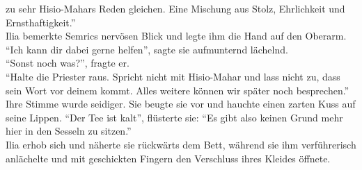 zu sehr Hisio-Mahars Reden gleichen. Eine Mischung aus Stolz, Ehrlichkeit und Ernsthaftigkeit.''\\
Ilia bemerkte Semrics nervösen Blick und legte ihm die Hand auf den Oberarm. ``Ich kann dir dabei 
gerne helfen'', sagte sie aufmunternd lächelnd.\\
``Sonst noch was?'', fragte er.\\
``Halte die Priester raus. Spricht nicht mit Hisio-Mahar und lass nicht zu, dass sein Wort vor 
deinem kommt. Alles weitere können wir später noch besprechen.'' Ihre Stimme wurde seidiger. Sie 
beugte sie vor und hauchte einen zarten Kuss auf seine Lippen. ``Der Tee ist kalt'', flüsterte sie: 
``Es gibt also keinen Grund mehr hier in den Sesseln zu sitzen.''\\
Ilia erhob sich und näherte sie rückwärts dem Bett, während sie ihm verführerisch anlächelte und 
mit geschickten Fingern den Verschluss ihres Kleides öffnete.\\

